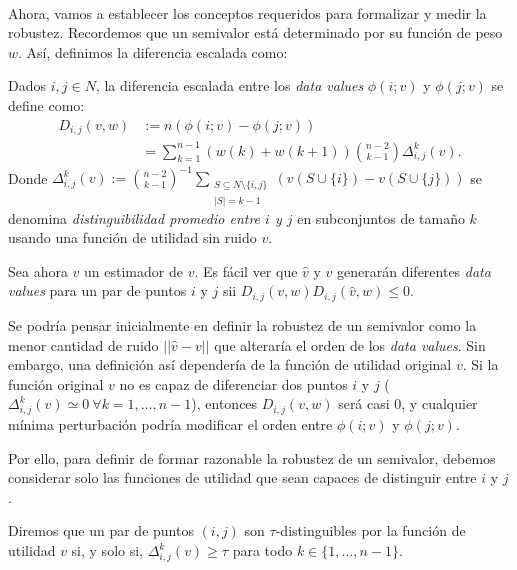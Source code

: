 \

Ahora, vamos a establecer los conceptos requeridos para
formalizar y medir la robustez. Recordemos que un semivalor
está determinado por su función de peso $w$. Así, definimos
la diferencia escalada como:


\begin{definition}
  Dados $i,j \in N$, la diferencia escalada 
  entre los \textit{data values} $\phi(i;v)$ y $\phi(j;v)$
  se define como: 
  \begin{align*}
    D_{i,j}(v,w)&:= n(\phi(i;v)-\phi(j;v))\\
    &=\sum_{k=1}^{n-1} (w(k)+w(k+1)) \binom{n-2}{k-1}
    \Delta_{i,j}^k(v).
  \end{align*}
  Donde $\Delta_{i,j}^k(v):=\binom{n-2}{k-1}^{-1} \sum_{\substack{
    S \subseteq N \setminus \{i,j\} \\ |S|=k-1}}
    (v(S \cup \{i\})-v(S \cup \{j\}))$ 
  se denomina \emph{distinguibilidad promedio entre $i$ y $j$} en
  subconjuntos de tamaño $k$ usando una función de utilidad
  sin ruido $v$.
\end{definition}

Sea ahora $\hat{v}$ un estimador de $v$. Es fácil ver que
 $\hat{v}$ y $v$ generarán diferentes
\textit{data values} para un par de puntos $i$ y $j$ sii
$D_{i,j}(v,w)D_{i,j}(\hat{v},w) \leq 0$.

Se podría pensar
inicialmente en definir la robustez de un semivalor como
la menor cantidad de ruido $||\hat{v}-v||$ que alteraría
el orden de los \textit{data values}. Sin embargo, una
definición así dependería de la función de utilidad original $v$.
Si la función original $v$ no es capaz de diferenciar
dos puntos $i$ y $j$ ($\Delta_{i,j}^{k}(v)\simeq 0\ \forall
k=1,\dots,n-1$), entonces $D_{i,j}(v,w)$ será
casi 0, y cualquier mínima perturbación podría 
modificar el orden entre $\phi(i;v)$ y $\phi(j;v)$. 

Por ello, para definir de formar razonable la
robustez de un semivalor, debemos considerar solo las
funciones de utilidad que sean capaces de distinguir
entre $i$ y $j$.

\begin{definition}
  Diremos que un par de puntos $(i,j)$ son $\tau$-distinguibles por
  la función de utilidad $v$ si, y solo si, $\Delta_{i,j}^{k}(v) \geq \tau$
  para todo $k \in \{1,\dots,n-1\}$.
\end{definition}

